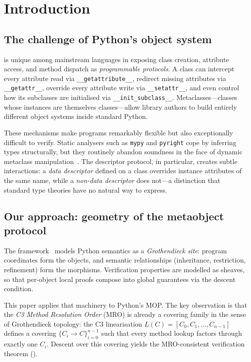 \documentclass[11pt]{article}
\newcommand{\Clin}[1]{L(#1)}                     %
\newcommand{\getattr}{\texttt{\_\_getattr\_\_}}
\newcommand{\setattr}{\texttt{\_\_setattr\_\_}}
\newcommand{\getattribute}{\texttt{\_\_getattribute\_\_}}
\newcommand{\initsubclass}{\texttt{\_\_init\_subclass\_\_}}
\begin{document}
\section{Introduction}\label{sec:intro}

\subsection{The challenge of Python's object system}

\Python{} is unique among mainstream languages in exposing class
creation, attribute access, and method dispatch as \emph{programmable
protocols}.  A class can intercept every attribute read via
\getattribute, redirect missing attributes via \getattr, override every
attribute write via \setattr, and even control how its subclasses are
initialised via \initsubclass.  Metaclasses---classes whose instances
are themselves classes---allow library authors to build entirely
different object systems inside standard Python.

These mechanisms make \Python{} programs remarkably flexible but also
exceptionally difficult to verify.  Static analysers such as \texttt{mypy}
and \texttt{pyright} cope by inferring types structurally, but they
routinely abandon soundness in the face of dynamic metaclass
manipulation~\cite{lehtosalo2016mypy}.
The descriptor protocol, in particular, creates subtle interactions:
a \emph{data descriptor} defined on a class overrides instance attributes
of the same name, while a \emph{non-data descriptor} does not---a
distinction that standard type theories have no natural way to express.

\subsection{Our approach: geometry of the metaobject protocol}

The \JuGeo{} framework~\cite{jugeo-paper01} models Python semantics as
a \emph{Grothendieck site}: program coordinates form the objects, and
semantic relationships (inheritance, restriction, refinement) form the
morphisms.  Verification properties are modelled as sheaves, so that
per-object local proofs compose into global guarantees via the descent
condition.

This paper applies that machinery to Python's MOP.
The key observation is that the \emph{C3 Method Resolution Order} (MRO)
is already a covering family in the sense of Grothendieck topology: the
C3 linearisation $\Clin{C} = [C_0, C_1, \ldots, C_{n-1}]$ defines a
covering $\{C_i \to C\}_{i=0}^{n-1}$ such that every method lookup
factors through exactly one $C_i$.  Descent over this covering yields
the MRO-consistent verification theorem ().
\end{document}
